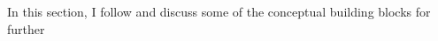 In this section, I follow \citet[Chapter~5]{campbell2017financial} and discuss some 
of the conceptual building blocks for further 
